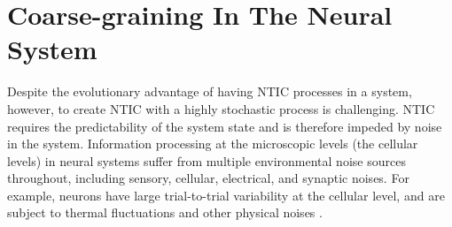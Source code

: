 \documentclass[utf8]{article}
\begin{document}
            
            


	\section{Coarse-graining In The Neural System} \label{sec:Neural coarse-graining}

		Despite the evolutionary advantage of having NTIC processes in a system, however, to create NTIC with a highly stochastic process is challenging. NTIC requires the predictability of the system state and is therefore impeded by noise in the system. Information processing at the microscopic levels (the cellular levels) in neural systems suffer from multiple environmental noise sources throughout, including sensory, cellular, electrical, and synaptic noises. For example, neurons have large trial-to-trial variability at the cellular level, and are subject to thermal fluctuations and other physical noises \citep{faisal2008noise}. 
		
\end{document}

